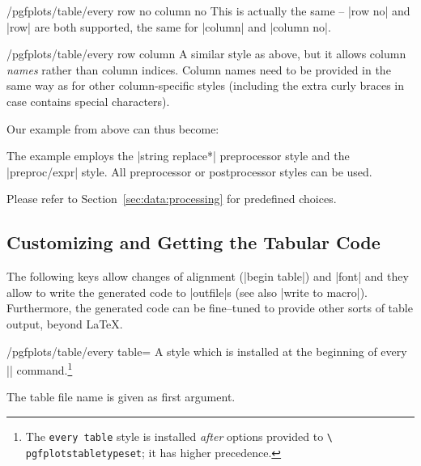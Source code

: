 \begin{stylekey}{/pgfplots/table/every row no  column no }
    This is actually the same -- |row no| and |row| are both supported, the
    same for |column| and |column no|.
\end{stylekey}

\begin{stylekey}{/pgfplots/table/every row  column }
    A similar style as above, but it allows column \emph{names} rather than
    column indices. Column names need to be provided in the same way as for
    other column-specific styles (including the extra curly braces in case
     contains special characters).

    Our example from above can thus become:
\begin{codeexample}[pre={\begin{lateximage}},post={\end{lateximage}}]
\end{codeexample}
    The example employs the |string replace*| preprocessor style and the
    |preproc/expr| style. All preprocessor or postprocessor styles can be used.

    Please refer to Section~\ref{sec:data:processing} for predefined choices.
\end{stylekey}


\subsection{Customizing and Getting the Tabular Code}

The following keys allow changes of alignment (|begin table|) and |font| and
they allow to write the generated code to |outfile|s (see also
|write to macro|). Furthermore, the generated code can be fine--tuned to
provide other sorts of table output, beyond \LaTeX{}.

\begin{stylekey}{/pgfplots/table/every table=}
    A style which is installed at the beginning of every
    |\pgfplotstabletypeset| command.\footnote{The \texttt{every table} style is
    installed \emph{after} options provided to \texttt{\textbackslash
    pgfplotstabletypeset}; it has higher precedence.}

    The table file name is given as first argument.
\end{stylekey}

